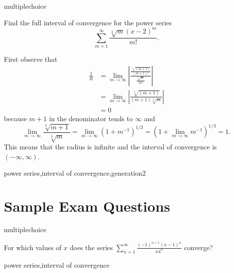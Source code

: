 \documentclass{ximera}
\begin{document}
\begin{question}[PowerSerInterval005]
\begin{type}
multiplechoice
\end{type}
Find the full interval of convergence for the power series \[\sum_{m=1}^{\infty} \frac{\sqrt[3]{m}(x - 2)^m }{m!}.\]
\begin{multiplechoice}
\choice{\(\displaystyle \left[1,3\right)\)}
\choice{\(\displaystyle \left(1,3\right]\)}
\choice{\(\displaystyle \left[1,3\right]\)}
\choice[correct]{\(\displaystyle \left(-\infty,\infty\right)\)}
\end{multiplechoice}
\begin{feedback}
First observe that 
\[\begin{aligned}
\frac{1}{R} & = \lim_{m\rightarrow \infty} \left| \frac{\frac{\sqrt[3]{{(m+1)}} }{{(m+1)}!} }{\frac{\sqrt[3]{m} }{m!}} \right| \\
& = \lim_{m\rightarrow \infty} \left| \frac{\sqrt[3]{{(m+1)}} }{(m+1)\sqrt[3]{m} } \right| \\
& = 0
\end{aligned}\]
because \(m+1\) in the denominator tends to \(\infty\) and \[\lim_{m \rightarrow \infty} \frac{\sqrt[3]{m+1}}{\sqrt[3]{m}} = \lim_{m \rightarrow \infty} \left( 1 + m^{-1} \right)^{1/3} = \left( 1 + \lim_{m \rightarrow \infty} m^{-1} \right)^{1/3} = 1.\]
This means that the radius is infinite and the interval of convergence is \((-\infty,\infty)\).
\end{feedback}
\begin{keywords}
power series,interval of convergence,generation2
\end{keywords}
\end{question}

\section*{Sample Exam Questions}

\begin{question}[2015C.03]
\begin{type}
multiplechoice
\end{type}
For which values of \(x\) does the series \(\displaystyle \sum_{n=1}^\infty \frac{(-1)^{n+1}(x-1)^n}{n 4^n}\) converge?
\begin{multiplechoice}
\end{multiplechoice}
\begin{keywords}
power series,interval of convergence
\end{keywords}
\end{question}
\end{document}
